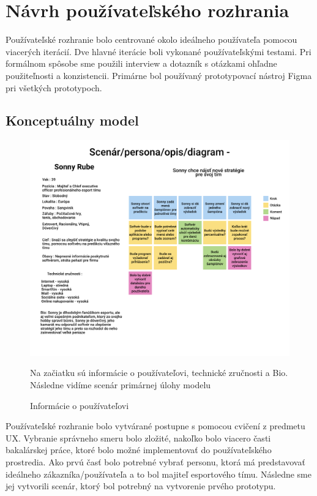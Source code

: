 \chapter{Návrh používateľského rozhrania}

\label{summary}

Používateľské rozhranie bolo centrované okolo ideálneho používateľa pomocou viacerých iterácií. Dve hlavné iterácie boli vykonané používateľskými testami. Pri formálnom spôsobe sme použili interview a dotazník s otázkami ohľadne použiteľnosti a konzistencii. Primárne bol používaný prototypovací nástroj Figma pri všetkých prototypoch.



\section*{Konceptuálny model}



\begin{figure}[h!]
	
	\includegraphics[width=.9\textwidth]{figures/scenar}
	
	\centering
	
	\caption{ Informácie o používateľovi \label{scenar}}
	
	Na začiatku sú informácie o používateľovi, technické zručnosti a Bio. Následne vidíme scenár primárnej úlohy modelu
	
\end{figure}



Používateľské rozhranie bolo vytvárané postupne s pomocou cvičení z predmetu UX. Vybranie správneho smeru bolo zložité, nakoľko bolo viacero časti bakalárskej práce, ktoré bolo možné implementovať do používateľského prostredia. Ako prvú časť bolo potrebné vybrať personu, ktorá má predstavovať ideálneho zákazníka/používateľa a to bol majiteľ esportového tímu. Následne sme jej vytvorili scenár, ktorý bol potrebný na vytvorenie prvého prototypu. 



